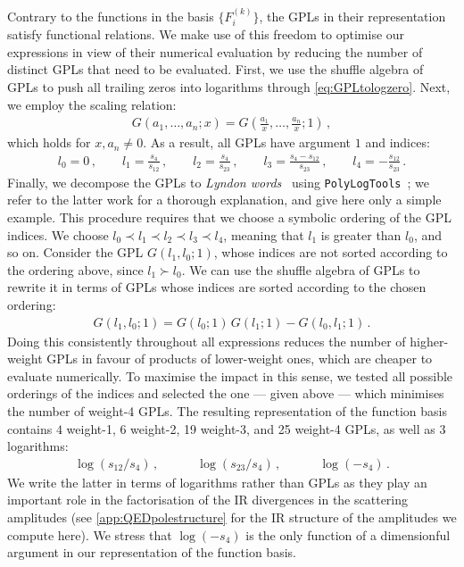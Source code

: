 \documentclass[main.tex]{subfiles}
\begin{document}
Contrary to the functions in the basis $\{F^{(k)}_i\}$, the GPLs in their representation satisfy functional relations. We make use of this freedom to optimise our expressions in view of their numerical evaluation by reducing the number of distinct GPLs that need to be evaluated. First, we use the shuffle algebra of GPLs to push all trailing zeros into logarithms through \cref{eq:GPLtologzero}. Next, we employ the scaling relation:
\begin{align}
G(a_1, \ldots, a_n; x) = G\left(\frac{a_1}{x}, \ldots, \frac{a_n}{x}; 1\right) \,,
\end{align}
which holds for $x, a_n \neq 0$. As a result, all GPLs have argument $1$ and indices:
\begin{align} \label{eqQED:indices}
l_0 = 0 \,, \qquad 
l_1 = \frac{s_4}{s_{12}} \,, \qquad 
l_2 = \frac{s_4}{s_{23}} \,, \qquad
l_3 = \frac{s_4-s_{12}}{s_{23}} \,, \qquad
l_4 = - \frac{s_{12}}{s_{23}}\,.
\end{align}
%
Finally, we decompose the GPLs to \emph{Lyndon words}~\cite{Radford1979ANR} using \texttt{PolyLogTools}~\cite{Duhr:2019tlz}; we refer to the latter work for a thorough explanation, and give here only a simple example. 
This procedure requires that we choose a symbolic ordering of the GPL indices. We choose $l_0 \prec l_1 \prec l_2 \prec l_3 \prec l_4$, meaning that $l_1$ is greater than $l_0$, and so on. 
Consider the GPL $G(l_1, l_0; 1)$, whose indices are not sorted according to the ordering above, since $l_1 \succ l_0$. We can use the shuffle algebra of GPLs to rewrite it in terms of GPLs whose indices are sorted according to the chosen ordering:
\begin{align}
G(l_1, l_0; 1) = G(l_0;1) \, G(l_1;1) - G(l_0, l_1; 1) \,.
\end{align}
Doing this consistently throughout all expressions reduces the number of higher-weight GPLs in favour of products of lower-weight ones, which are cheaper to evaluate numerically. To maximise the impact in this sense, we tested all possible orderings of the indices and selected the one --- given above --- which minimises the number of weight-4 GPLs.
The resulting representation of the function basis contains $4$ weight-1, 6 weight-2, 19 weight-3, and 25 weight-4 GPLs, as well as $3$ logarithms: 
\begin{align} \label{eqQED:logs}
\log(s_{12}/s_4) \,, \qquad \quad \log(s_{23}/s_4) \,, \qquad \quad \log(-s_4) \,.
\end{align}
We write the latter in terms of logarithms rather than GPLs as they play an important role in the factorisation of the IR divergences in the scattering amplitudes (see \cref{app:QEDpolestructure} for the IR structure of the amplitudes we compute here). We stress that $\log(-s_4)$ is the only function of a dimensionful argument in our representation of the function basis. 
\end{document}

